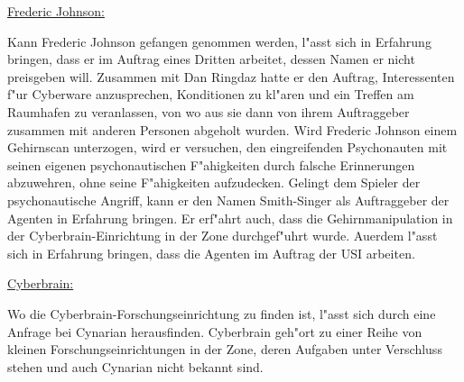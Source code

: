 \begin{remarks}
	\underline{Frederic Johnson:}

	Kann Frederic Johnson gefangen genommen werden, l"asst sich in Erfahrung bringen, dass er im Auftrag eines Dritten arbeitet, dessen Namen er nicht preisgeben will. Zusammen mit Dan Ringdaz hatte er den Auftrag, Interessenten f"ur Cyberware anzusprechen, Konditionen zu kl"aren und ein Treffen am Raumhafen zu veranlassen, von wo aus sie dann von ihrem Auftraggeber zusammen mit anderen Personen abgeholt wurden. Wird Frederic Johnson einem Gehirnscan unterzogen, wird er versuchen, den eingreifenden Psychonauten mit seinen eigenen psychonautischen F"ahigkeiten durch falsche Erinnerungen abzuwehren, ohne seine F"ahigkeiten aufzudecken. Gelingt dem Spieler der psychonautische Angriff, kann er den Namen Smith-Singer als Auftraggeber der Agenten in Erfahrung bringen. Er erf"ahrt auch, dass die Gehirnmanipulation in der Cyberbrain-Einrichtung in der Zone durchgef"uhrt wurde. Au\3erdem l"asst sich in Erfahrung bringen, dass die Agenten im Auftrag der USI arbeiten.	

	\underline{Cyberbrain:}

	Wo die Cyberbrain-Forschungseinrichtung zu finden ist, l"asst sich durch eine Anfrage bei Cynarian herausfinden. Cyberbrain geh"ort zu einer Reihe von kleinen Forschungseinrichtungen in der Zone, deren Aufgaben unter Verschluss stehen und auch Cynarian nicht bekannt sind.
\end{remarks}
